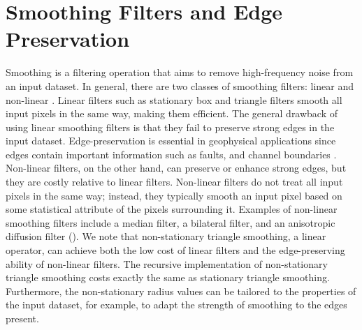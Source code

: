 \section{Smoothing Filters and Edge Preservation}
Smoothing is a filtering operation that aims to remove high-frequency noise from an input dataset. In general, there are two classes of smoothing filters: linear and non-linear \cite[]{hall2014}. Linear filters such as stationary box and triangle filters smooth all input pixels in the same way, making them efficient. The general drawback of using linear smoothing filters is that they fail to preserve strong edges in the input dataset. Edge-preservation is essential in geophysical applications since edges contain important information such as faults, and channel boundaries \cite[]{bahorichfarmer1995}. Non-linear filters, on the other hand, can preserve or enhance strong edges, but they are costly relative to linear filters. Non-linear filters do not treat all input pixels in the same way; instead, they typically smooth an input pixel based on some statistical attribute of the pixels surrounding it. Examples of non-linear smoothing filters include a median filter, a bilateral filter, and an anisotropic diffusion filter (\citealp{tukey1970,manduchiandtomasi1998,peronamalik1990}). We note that non-stationary triangle smoothing, a linear operator, can achieve both the low cost of linear filters and the edge-preserving ability of non-linear filters. The recursive implementation of non-stationary triangle smoothing costs exactly the same as stationary triangle smoothing. Furthermore, the non-stationary radius values can be tailored to the properties of the input dataset, for example, to adapt the strength of smoothing to the edges present.


